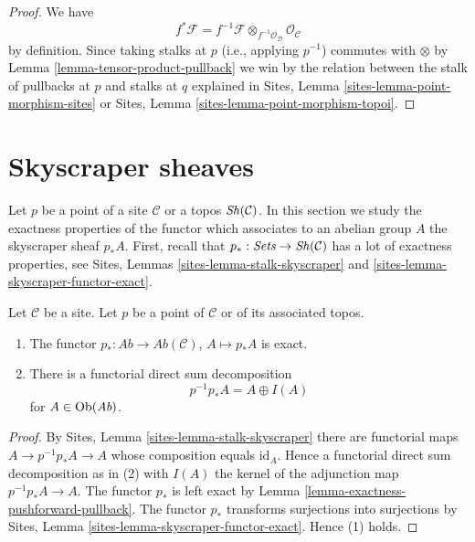 \begin{proof}
We have
$$
f^*\mathcal{F} =
f^{-1}\mathcal{F} \otimes_{f^{-1}\mathcal{O}_\mathcal{D}}
\mathcal{O}_\mathcal{C}
$$
by definition. Since taking stalks at $p$ (i.e., applying
$p^{-1}$) commutes with $\otimes$ by
Lemma \ref{lemma-tensor-product-pullback}
we win by the relation between the stalk of pullbacks at $p$
and stalks at $q$ explained in
Sites, Lemma \ref{sites-lemma-point-morphism-sites} or
Sites, Lemma \ref{sites-lemma-point-morphism-topoi}.
\end{proof}






\section{Skyscraper sheaves}
\label{section-skyscraper}

\noindent
Let $p$ be a point of a site $\mathcal{C}$ or a topos
$\mathop{\mathit{Sh}}\nolimits(\mathcal{C})$. In this section we study the exactness
properties of the functor which associates to an abelian group $A$
the skyscraper sheaf $p_*A$. First, recall that
$p_* : \textit{Sets} \to \mathop{\mathit{Sh}}\nolimits(\mathcal{C})$ has a lot
of exactness properties, see
Sites, Lemmas \ref{sites-lemma-stalk-skyscraper} and
\ref{sites-lemma-skyscraper-functor-exact}.

\begin{lemma}
\label{lemma-skyscraper-exact}
Let $\mathcal{C}$ be a site. Let $p$ be a point of
$\mathcal{C}$ or of its associated topos.
\begin{enumerate}
\item The functor $p_* : \textit{Ab} \to \textit{Ab}(\mathcal{C})$,
$A \mapsto p_*A$ is exact.
\item There is a functorial direct sum decomposition
$$
p^{-1}p_*A = A \oplus I(A)
$$
for $A \in \mathop{\mathrm{Ob}}\nolimits(\textit{Ab})$.
\end{enumerate}
\end{lemma}

\begin{proof}
By
Sites, Lemma \ref{sites-lemma-stalk-skyscraper}
there are functorial maps $A \to p^{-1}p_*A \to A$ whose composition
equals $\text{id}_A$. Hence a functorial direct sum decomposition
as in (2) with $I(A)$ the kernel of the adjunction map
$p^{-1}p_*A \to A$. The functor $p_*$ is left exact by
Lemma \ref{lemma-exactness-pushforward-pullback}.
The functor $p_*$ transforms surjections into surjections by
Sites, Lemma \ref{sites-lemma-skyscraper-functor-exact}.
Hence (1) holds.
\end{proof}

